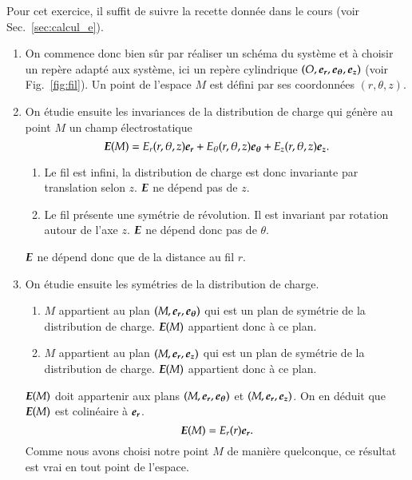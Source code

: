 \begin{corrige}
	Pour cet exercice, il suffit de suivre la recette donnée dans le cours
	(voir Sec.~\ref{sec:calcul_e}).
	\begin{enumerate}
		\item On commence donc bien sûr par réaliser un schéma du système
		  et à choisir un repère adapté aux système, ici un repère
		  cylindrique $(O, \er, \etheta, \ez)$ (voir Fig.~\ref{fig:fil}).
		  Un point de l'espace $M$ est défini par ses coordonnées 
		  $(r, \theta, z)$.
		\item On étudie ensuite les invariances de la distribution de charge
		  qui génère au point $M$ un champ électrostatique
		  \begin{equation*}
			  \vece(M) = E_r(r, \theta, z)\er + E_\theta(r, \theta, z)\etheta +
			             E_z(r, \theta, z)\ez.
		 \end{equation*}
		 \begin{enumerate}
			 \item Le fil est infini, la distribution de charge est
		           donc invariante par translation selon $z$. $\vece$
			   ne dépend pas de $z$.
			 \item Le fil présente une symétrie de révolution.
		           Il est invariant par rotation autour de l'axe $z$.
			   $\vece$ ne dépend donc pas de $\theta$.
		\end{enumerate}
		$\vece$ ne dépend donc que de la distance au fil $r$.

	\item On étudie ensuite les symétries de la distribution de charge.
	\begin{enumerate}
		\item $M$ appartient au plan $(M, \er, \etheta)$ qui est un plan
			de symétrie de la distribution de charge. $\vece(M)$ appartient
		  donc à ce plan.
		\item $M$ appartient au plan $(M, \er, \ez)$ qui est un plan de
		  symétrie de la distribution de charge. $\vece(M)$ appartient 
		  donc à ce plan.
	\end{enumerate}
	$\vece(M)$ doit appartenir aux plans $(M, \er, \etheta)$ et $(M, \er, \ez)$.
	On en déduit que $\vece(M)$ est colinéaire à $\er$.
	\begin{equation*}
		\vece(M) = E_r(r)\er.
	\end{equation*}
	Comme nous avons choisi
	notre point $M$  de manière quelconque, ce résultat est vrai en tout 
	point de l'espace.


\end{enumerate}
\end{corrige}
